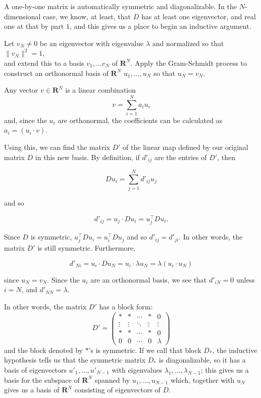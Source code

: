 \documentclass[
]{article}
\begin{document}
A one-by-one matrix is automatically symmetric and diagonalizable. In
the \(N\)-dimensional case, we know, at least, that \(D\) has at least
one eigenvector, and real one at that by part \(1\), and this gives us a
place to begin an inductive argument.

Let \(v_{N}\not=0\) be an eigenvector with eigenvalue \(\lambda\) and
normalized so that \(\|v_{N}\|^2=1\),\\
and extend this to a basis \(v_{1},\ldots v_{N}\) of \(\mathbf{R}^{N}\).
Apply the Gram-Schmidt process to construct an orthonormal basis of
\(\mathbf{R}^{N}\) \(u_{1},\ldots, u_{N}\) so that \(u_{N}=v_{N}\).

Any vector \(v\in\mathbf{R}^{N}\) is a linear combination \[
v = \sum_{i=1}^{N} a_{i}u_{i}
\] and, since the \(u_{i}\) are orthonormal, the coefficients can be
calculated as \(a_{i}=(u_{i}\cdot v)\).

Using this, we can find the matrix \(D'\) of the linear map defined by
our original matrix \(D\) in this new basis. By definition, if
\(d'_{ij}\) are the entries of \(D'\), then

\[
Du_{i} = \sum_{j=1}^{N} d'_{ij} u_{j}
\]

and so

\[
d'_{ij} = u_{j}\cdot Du_{i} = u_{j}^{\intercal}Du_{i}.
\]

Since \(D\) is symmetric,
\(u_{j}^{\intercal}Du_{i} =u_{i}^{\intercal}Du_{j}\) and so
\(d'_{ij}=d'_{ji}\). In other words, the matrix \(D'\) is still
symmetric. Furthermore,

\[
d'_{Ni} = u_{i}\cdot Du_{N} = u_{i}\cdot \lambda u_{N} = \lambda (u_{i}\cdot u_{N})
\]

since \(u_{N}=v_{N}\). Since the \(u_{i}\) are an orthonormal basis, we
see that \(d'_{iN}=0\) unless \(i=N\), and \(d'_{NN}=\lambda\).

In other words, the matrix \(D'\) has a block form: \[
D' = \left(\begin{matrix} * & * & \cdots &*  & 0 \\ \vdots & \vdots & \ddots   & \vdots & \vdots \\
* & * & \cdots &*  & 0 \\
0 & 0 & \cdots &0 &\lambda \end{matrix}\right)
\] and the block denoted by \(*\)'s is symmetric. If we call that block
\(D_{*}\), the inductive hypothesis tells us that the symmetric matrix
\(D_{*}\) is diagonalizable, so it has a basis of eigenvectors
\(u'_{1},\ldots, u'_{N-1}\) with eigenvalues
\(\lambda_{1},\ldots, \lambda_{N-1}\); this gives us a basis for the
subspace of \(\mathbf{R}^{N}\) spanned by \(u_{1},\ldots, u_{N-1}\)
which, together with \(u_{N}\) gives us a basis of \(\mathbf{R}^{N}\)
consisting of eigenvectors of \(D\).
\end{document}

